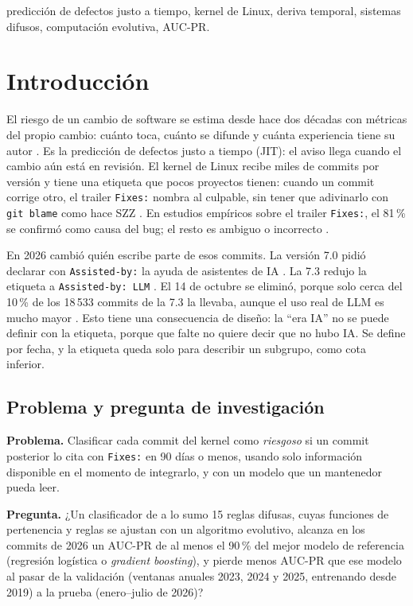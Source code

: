 \documentclass[conference,letterpaper]{IEEEtran}
\begin{document}
\begin{IEEEkeywords}
predicción de defectos justo a tiempo, kernel de Linux, deriva temporal, sistemas difusos, computación evolutiva, AUC-PR.
\end{IEEEkeywords}

\section{Introducción}

El riesgo de un cambio de software se estima desde hace dos décadas con métricas del propio cambio: cuánto toca, cuánto se difunde y cuánta experiencia tiene su autor \cite{Mockus2000,Kamei2013}. Es la predicción de defectos justo a tiempo (JIT): el aviso llega cuando el cambio aún está en revisión. El kernel de Linux recibe miles de commits por versión y tiene una etiqueta que pocos proyectos tienen: cuando un commit corrige otro, el trailer \texttt{Fixes:} nombra al culpable, sin tener que adivinarlo con \texttt{git blame} como hace SZZ \cite{Sliwerski2005}. En estudios empíricos sobre el trailer \texttt{Fixes:}, el 81\,\% se confirmó como causa del bug; el resto es ambiguo o incorrecto \cite{Lyu2024}.

En 2026 cambió quién escribe parte de esos commits. La versión 7.0 pidió declarar con \texttt{Assisted-by:} la ayuda de asistentes de IA \cite{KernelAdd}. La 7.3 redujo la etiqueta a \texttt{Assisted-by: LLM} \cite{KernelSimpl}. El 14 de octubre se eliminó, porque solo cerca del 10\,\% de los 18\,533 commits de la 7.3 la llevaba, aunque el uso real de LLM es mucho mayor \cite{KernelRemove}. Esto tiene una consecuencia de diseño: la ``era IA'' no se puede definir con la etiqueta, porque que falte no quiere decir que no hubo IA. Se define por fecha, y la etiqueta queda solo para describir un subgrupo, como cota inferior.


\subsection{Problema y pregunta de investigación}

\textbf{Problema.} Clasificar cada commit del kernel como \emph{riesgoso} si un commit posterior lo cita con \texttt{Fixes:} en 90 días o menos, usando solo información disponible en el momento de integrarlo, y con un modelo que un mantenedor pueda leer.

\textbf{Pregunta.} ¿Un clasificador de a lo sumo 15 reglas difusas, cuyas funciones de pertenencia y reglas se ajustan con un algoritmo evolutivo, alcanza en los commits de 2026 un AUC-PR de al menos el 90\,\% del mejor modelo de referencia (regresión logística o \emph{gradient boosting}), y pierde menos AUC-PR que ese modelo al pasar de la validación (ventanas anuales 2023, 2024 y 2025, entrenando desde 2019) a la prueba (enero--julio de 2026)?
\end{document}
